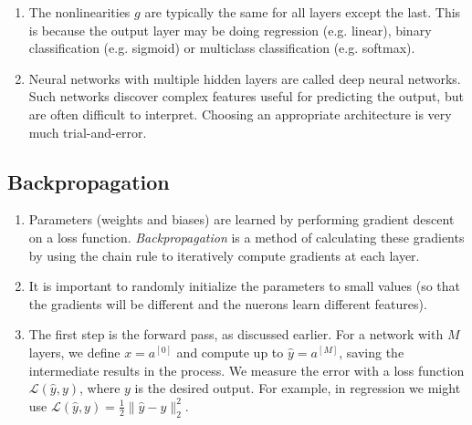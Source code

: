 \documentclass[10pt]{article}
\begin{document}
\begin{multicols}{2}
\begin{addmargin}[0.8em]{0.5em}
\begin{enumerate}[label=(\alph*)]
        \item The nonlinearities $g$ are typically the same for all layers except the last. This is because the output layer may be doing regression (e.g. linear), binary classification (e.g. sigmoid) or multiclass classification (e.g. softmax).
        
        \item Neural networks with multiple hidden layers are called deep neural networks. Such networks discover complex features useful for predicting the output, but are often difficult to interpret. Choosing an appropriate architecture is very much trial-and-error.     
    \end{enumerate}
    \vspace{-0.3cm}
    \subsection{Backpropagation}
    \begin{enumerate}[label=(\alph*)]
        \item Parameters (weights and biases) are learned by performing gradient descent on a loss function. \textit{Backpropagation} is a method of calculating these gradients by using the chain rule to iteratively compute gradients at each layer.
        
        \item It is important to randomly initialize the parameters to small values (so that the gradients will be different and the nuerons learn different features).        
        
        \item The first step is the forward pass, as discussed earlier. For a network with $M$ layers, we define $x=a^{[0]}$ and compute up to $\hat{y}=a^{[M]}$, saving the intermediate results in the process. We measure the error with a loss function $\mathcal{L}(\hat{y}, y)$, where $y$ is the desired output. For example, in regression we might use
        $\mathcal{L}(\hat{y}, y) = \frac{1}{2} \| \hat{y} - y \|_2^2$.
        

\end{enumerate}
\end{addmargin}
\end{multicols}
\end{document}
